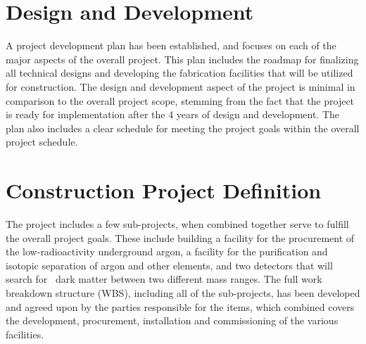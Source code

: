 

\section{Design and Development}

A project development plan has been established, and focuses on each of the major aspects of the overall project.  This plan includes the roadmap for finalizing all technical designs and developing the fabrication facilities that will be utilized for construction.  The design and development aspect of the project is minimal in comparison to the overall project scope, stemming from the fact that the project is ready for implementation after the 4 years of design and development.  The plan also includes a clear schedule for meeting the project goals within the overall project schedule.  





\section{Construction Project Definition}

The project includes a few sub-projects, when combined together serve to fulfill the overall project goals.  These include building a facility for the procurement of the low-radioactivity underground argon, a facility for the purification and isotopic separation of argon and other elements, and two detectors that will search for \WIMP\ dark matter between two different mass ranges.  The full work breakdown structure (WBS), including all of the sub-projects, has been developed and agreed upon by the parties responsible for the items, which combined covers the development, procurement, installation and commissioning of the various facilities.  

